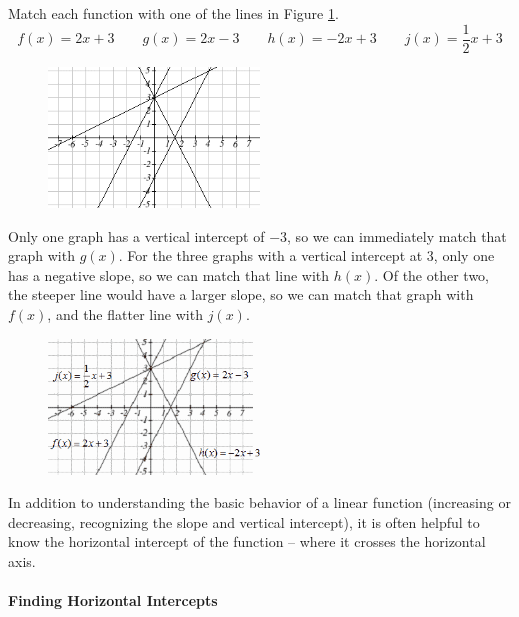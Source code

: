 \begin{example}
Match each function with one of the lines in Figure \ref{fig:matchlines}.
    $$f(x) = 2x+3 \quad \quad g(x) = 2x-3 \quad\quad h(x) = -2x+3 \quad\quad j(x) = \frac{1}{2}x+3$$

\begin{figure}[!ht]
  \centering
  \includegraphics[width=0.5\textwidth]{img/chap1/sec1-4/image052.png}
  \caption{}
  \label{fig:matchlines}
\end{figure}

\begin{solution} Only one graph has a vertical intercept of $-3$, so we can immediately match that graph with $g(x)$. For the three graphs with a vertical intercept at 3, only one has a negative slope, so we can match that line with $h(x)$. Of the other two, the steeper line would have a larger slope, so we can match that graph with $f(x)$, and the flatter line with $j(x)$.
\begin{figure}[!ht]
\centering
\includegraphics[width=0.5\textwidth]{img/chap1/sec1-4/image095.png}
\caption{}
\end{figure}

\end{solution}\end{example}

In addition to understanding the basic behavior of a linear function (increasing or decreasing, recognizing the slope and vertical intercept), it is often helpful to know the horizontal intercept of the function -- where it crosses the horizontal axis.

\paragraph*{Finding Horizontal Intercepts}

